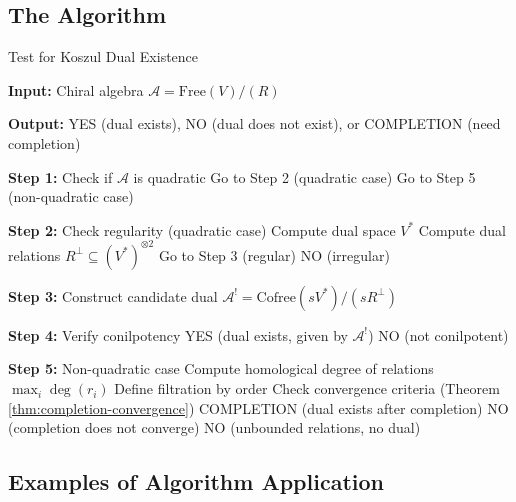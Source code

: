 \subsection{The Algorithm}

\begin{algorithm}[H]
\caption{Test for Koszul Dual Existence}
\label{alg:koszul-dual-existence}

\textbf{Input:} Chiral algebra $\mathcal{A} = \text{Free}(V) / (R)$

\textbf{Output:} YES (dual exists), NO (dual does not exist), or COMPLETION (need completion)

\begin{algorithmic}[1]
\State \textbf{Step 1:} Check if $\mathcal{A}$ is quadratic
    \State Go to Step 2 (quadratic case)
\Else
    \State Go to Step 5 (non-quadratic case)
\EndIf

\State \textbf{Step 2:} Check regularity (quadratic case)
\State Compute dual space $V^*$
\State Compute dual relations $R^\perp \subseteq (V^*)^{\otimes 2}$
    \State Go to Step 3 (regular)
\Else
    \State \Return NO (irregular)
\EndIf

\State \textbf{Step 3:} Construct candidate dual
\State $\mathcal{A}^! = \text{Cofree}(sV^*) / (sR^\perp)$

\State \textbf{Step 4:} Verify conilpotency
    \State \Return YES (dual exists, given by $\mathcal{A}^!$)
\Else
    \State \Return NO (not conilpotent)
\EndIf

\State \textbf{Step 5:} Non-quadratic case
\State Compute homological degree of relations $\max_i \deg(r_i)$
    \State Define filtration by order
    \State Check convergence criteria (Theorem \ref{thm:completion-convergence})
        \State \Return COMPLETION (dual exists after completion)
    \Else
        \State \Return NO (completion does not converge)
    \EndIf
\Else
    \State \Return NO (unbounded relations, no dual)
\EndIf
\end{algorithmic}
\end{algorithm}

\subsection{Examples of Algorithm Application}

